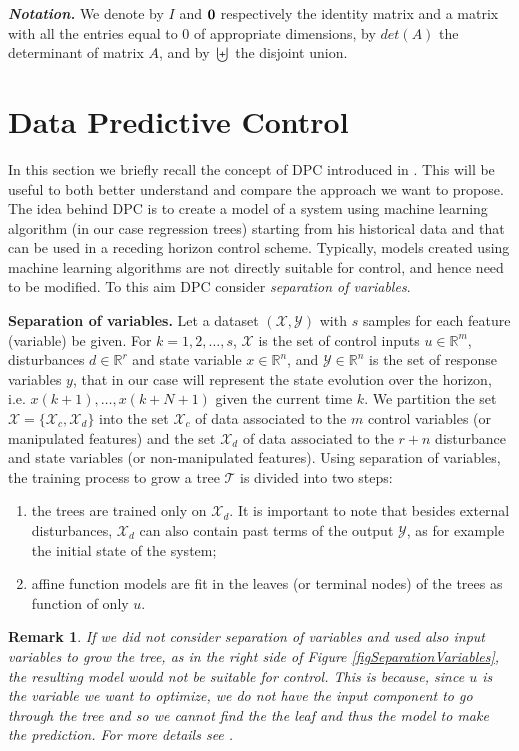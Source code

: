 \documentclass[letterpaper, 10 pt, conference]{ifacconf}  %
\newtheorem{remark}{Remark}
\begin{document}
\textbf{\emph{Notation.}} We denote by $I$ and $\bold{0}$ respectively the identity matrix and a matrix with all the entries equal to $0$ of appropriate dimensions, by $det(A)$ the determinant of matrix $A$, and by $\biguplus$ the disjoint union.

\section{Data Predictive Control}\label{secDPC}
In this section we briefly recall the concept of DPC introduced in \cite{JainACC2017}. This will be useful to both better understand and compare the approach we want to propose. The idea behind DPC is to create a model of a system using machine learning algorithm (in our case regression trees) starting from his historical data and that can be used in a receding horizon control scheme. Typically, models created using machine learning algorithms are not directly suitable for control, and hence need to be modified. To this aim DPC consider \emph{separation of variables}.

\textbf{Separation of variables.} Let a dataset $(\mathcal{X},\mathcal{Y})$ with $s$ samples for each feature (variable) be given. For $k=1,2,\ldots,s$, $\mathcal{X}$ is the set of control inputs $u\in\mathbb{R}^m$, disturbances $d\in\mathbb{R}^r$ and state variable $x\in\mathbb{R}^n$, and $\mathcal{Y}\in\mathbb{R}^n$ is the set of response variables $y$, that in our case will represent the state evolution over the horizon, i.e. $x(k+1),\ldots,x(k+N+1)$ given the current time $k$. We partition the set $\mathcal{X}=\{\mathcal{X}_c,\mathcal{X}_d\}$ into the set $\mathcal{X}_c$ of data associated to the $m$ control variables (or manipulated features) and the set $\mathcal{X}_d$ of data associated to the $r+n$ disturbance and state variables (or non-manipulated features). Using separation of variables, the training process to grow a tree $\mathcal{T}$ is divided into two steps:
\begin{enumerate}
\item the trees are trained only on $\mathcal{X}_d$. It is important to note that besides external disturbances, $\mathcal{X}_d$ can also contain past terms of the output $\mathcal{Y}$, as for example the initial state of the system;
\item affine function models are fit in the leaves (or terminal nodes) of the trees as function of only $u$. 
\end{enumerate}

\begin{remark}
	If we did not consider separation of variables and used also input variables to grow the tree, as in the right side of Figure \ref{figSeparationVariables}, the resulting model would not be suitable for control. This is because, since $u$ is the variable we want to optimize, we do not have the input component to go through the tree and so we cannot find the the leaf and thus the model to make the prediction. For more details see \cite{JainACC2017}.
\end{remark}
\end{document}
